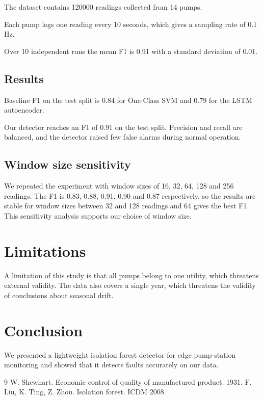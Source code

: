 \documentclass{article}
\begin{document}
The dataset contains 120000 readings collected from 14 pumps.

Each pump logs one reading every 10 seconds, which gives a sampling rate of 0.1 Hz.

Over 10 independent runs the mean F1 is 0.91 with a standard deviation of 0.01.

\subsection{Results}
Baseline F1 on the test split is 0.84 for One-Class SVM and 0.79 for the LSTM autoencoder.

Our detector reaches an F1 of 0.91 on the test split. Precision and recall are balanced, and the detector raised few false alarms during normal operation.

\subsection{Window size sensitivity}
We repeated the experiment with window sizes of 16, 32, 64, 128 and 256 readings. The F1 is 0.83, 0.88, 0.91, 0.90 and 0.87 respectively, so the results are stable for window sizes between 32 and 128 readings and 64 gives the best F1. This sensitivity analysis supports our choice of window size.

\section{Limitations}
A limitation of this study is that all pumps belong to one utility, which threatens external validity. The data also covers a single year, which threatens the validity of conclusions about seasonal drift.

\section{Conclusion}
We presented a lightweight isolation forest detector for edge pump-station monitoring and showed that it detects faults accurately on our data.

\begin{thebibliography}{9}
 W. Shewhart. Economic control of quality of manufactured product. 1931.
 F. Liu, K. Ting, Z. Zhou. Isolation forest. ICDM 2008.
\end{thebibliography}
\end{document}
